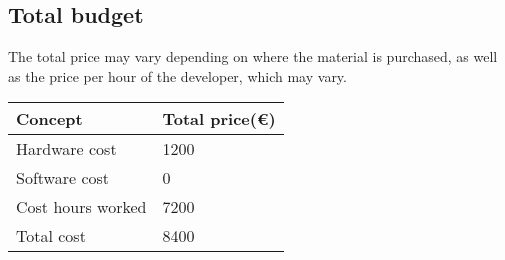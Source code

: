 \subsection{Total budget}
{The total price may vary depending on where the material is purchased, as well as the price per hour of the developer, which may vary.}

\begin{center}
\centering
\begin{tabular}{ll}
  \toprule
  Concept  &  Total price(\euro) \\
  \midrule
	Hardware cost & 1200\\
	Software cost & 0\\
	Cost hours worked & 7200\\
	Total cost & 8400\\
  \bottomrule
\end{tabular}
\end{center}